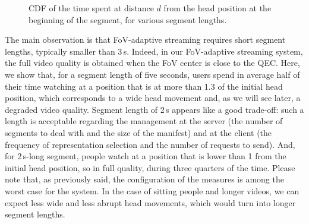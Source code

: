 \begin{figure}[htbp]
\centering

\caption{CDF of the time spent at distance $d$ from the head position at the beginning of the 
segment, for various segment lengths.}\label{cdf-dataset}
\end{figure}

The main observation is that FoV-adaptive streaming requires short segment lengths, typically 
smaller than 3\,s. Indeed, in our FoV-adaptive streaming system, the full video quality is obtained
when the FoV center is close to the QEC. Here, we show that, for a segment length of five seconds,
users spend in average half of their time watching at a position that is at more than 
1.3 of the initial head position,
which corresponds to a wide head movement and, as we will see later, a degraded video quality.
Segment length of 2\,s appears like a good trade-off: such a length is acceptable regarding the
management at the server (the number of segments to deal with and the size of the manifest)
and at the client (the frequency of representation selection and the number of requests
to send). And, for 2\,s-long segment, people watch
at a position that is lower than 1 from the initial head position, so in full quality, during three quarters 
of the time. Please note that, as previously said, the configuration of the measures is among
the worst case for the system. In the case of sitting people and longer videos, we can expect less
wide and less abrupt head movements, which would turn into longer segment lengths.
